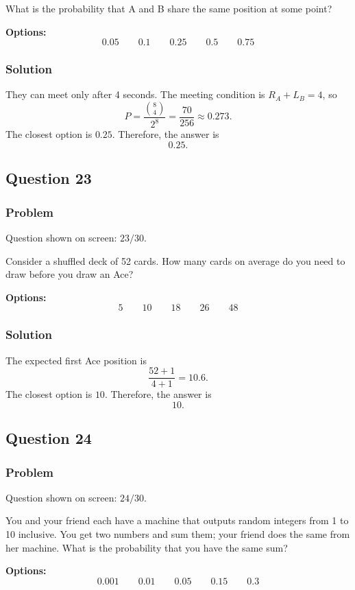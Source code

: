 \documentclass[12pt]{article}
\begin{document}
What is the probability that A and B share the same position at some point?

\noindent\textbf{Options:}
\[
\boxed{0.05}
\qquad
\boxed{0.1}
\qquad
\boxed{0.25}
\qquad
\boxed{0.5}
\qquad
\boxed{0.75}
\]

\subsubsection{Solution}
They can meet only after 4 seconds. The meeting condition is \(R_A+L_B=4\), so
\[
P=\frac{\binom{8}{4}}{2^8}=\frac{70}{256}\approx 0.273.
\]
The closest option is \(0.25\). Therefore, the answer is
\[
\boxed{0.25}.
\]

\subsection{Question 23}
\subsubsection{Problem}
Question shown on screen: \(23/30\).

Consider a shuffled deck of 52 cards. How many cards on average do you need to draw before you draw an Ace?

\noindent\textbf{Options:}
\[
\boxed{5}
\qquad
\boxed{10}
\qquad
\boxed{18}
\qquad
\boxed{26}
\qquad
\boxed{48}
\]

\subsubsection{Solution}
The expected first Ace position is
\[
\frac{52+1}{4+1}=10.6.
\]
The closest option is \(10\). Therefore, the answer is
\[
\boxed{10}.
\]

\subsection{Question 24}
\subsubsection{Problem}
Question shown on screen: \(24/30\).

You and your friend each have a machine that outputs random integers from 1 to 10 inclusive. You get two numbers and sum them; your friend does the same from her machine. What is the probability that you have the same sum?

\noindent\textbf{Options:}
\[
\boxed{0.001}
\qquad
\boxed{0.01}
\qquad
\boxed{0.05}
\qquad
\boxed{0.15}
\qquad
\boxed{0.3}
\]
\end{document}
